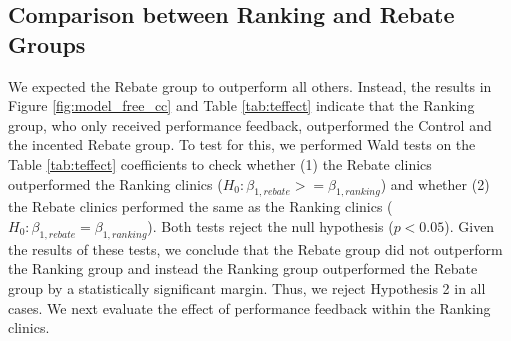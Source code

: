   \begin{table}[htbp]
 \end{table}
 
 \subsection{Comparison between Ranking and Rebate Groups} \label{cc_res_comp}
 We expected the Rebate group to outperform all others. Instead, the results in Figure \ref{fig:model_free_cc} and Table \ref{tab:teffect} indicate that the Ranking group, who only received performance feedback, outperformed the Control and the incented Rebate group. To test for this, we performed Wald tests on the Table \ref{tab:teffect} coefficients to check whether (1) the Rebate clinics outperformed the Ranking clinics ($H_0: \beta_{1,rebate} >= \beta_{1,ranking}$) and whether (2) the Rebate clinics performed the same as the Ranking clinics ($H_0: \beta_{1,rebate} = \beta_{1,ranking}$). Both tests reject the null hypothesis ($p < 0.05$). Given the results of these tests, we conclude that the Rebate group did not outperform the Ranking group and instead the Ranking group outperformed the Rebate group by a statistically significant margin. Thus, we reject Hypothesis 2 in all cases. We next evaluate the effect of performance feedback within the Ranking clinics. 
 
